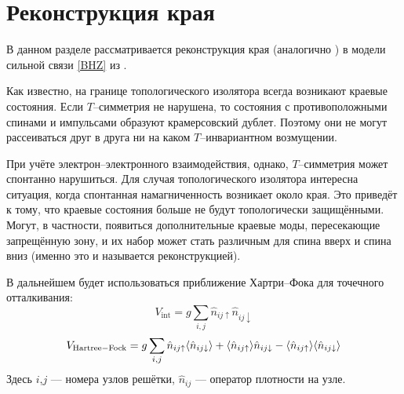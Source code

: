 \newpage
\section{Реконструкция края}
В данном разделе рассматривается реконструкция края (аналогично \cite{Wang2017}) 
в модели сильной связи \eqref{BHZ} из \cite{Bernevig2006}.

Как известно, на границе топологического изолятора всегда возникают краевые состояния. Если 
$T$--симметрия не нарушена, то
состояния с противоположными спинами и импульсами образуют крамерсовский дублет. Поэтому они
не могут рассеиваться друг в друга ни на каком $T$--инвариантном возмущении.

При учёте электрон--электронного взаимодействия, однако, $T$--симметрия может спонтанно
нарушиться. Для случая топологического изолятора интересна ситуация, 
когда спонтанная намагниченность возникает около края. Это приведёт к тому, что
краевые состояния больше не будут топологически защищёнными. Могут, в частности, появиться
дополнительные краевые моды, пересекающие запрещённую зону, и их набор
может стать различным для спина вверх и спина вниз (именно это и называется
реконструкцией).

В дальнейшем будет использоваться приближение Хартри--Фока для точечного отталкивания:
\begin{equation}
    V_{\mathrm{int}} = g\sum_{i,j} \hat{n}_{ij\uparrow} \hat{n}_{ij\downarrow}
\end{equation}
\begin{equation}
    V_{\mathrm{Hartree-Fock}} = g\sum_{i,j} 
                               \hat{n}_{ij\uparrow} \langle \hat{n}_{ij\downarrow}\rangle + 
                               \langle\hat{n}_{ij\uparrow}\rangle \hat{n}_{ij\downarrow} - 
                               \langle\hat{n}_{ij\uparrow}\rangle \langle\hat{n}_{ij\downarrow}\rangle 
\end{equation}
Здесь $i$,$j$ --- номера узлов решётки, $\hat{n}_{ij}$ --- оператор плотности на узле.

